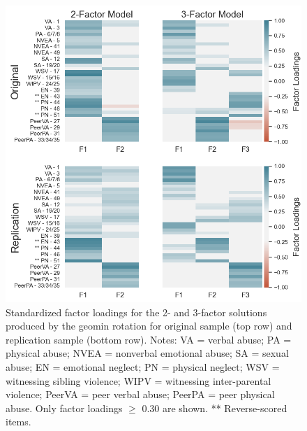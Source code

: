 \documentclass[letterpaper,man,natbib,longtable,floatsintext,12pt]{apa6}
\begin{document}
\begin{figure}[H]
    \centering
    \includegraphics[width=1\textwidth,center]{figures/figS05.png}
    \caption{\normalfont Standardized factor loadings for the 2- and 3-factor solutions produced by the geomin rotation for original sample (top row) and replication sample (bottom row). Notes: VA = verbal abuse; PA = physical abuse; NVEA = nonverbal emotional abuse; SA = sexual abuse; EN = emotional neglect; PN = physical neglect; WSV = witnessing sibling violence; WIPV = witnessing inter-parental violence; PeerVA = peer verbal abuse; PeerPA = peer physical abuse. Only factor loadings $\geq$ 0.30 are shown. ** Reverse-scored items.}
    \label{fig:efa_geomin}
\end{figure}

\pagebreak

\end{document}
